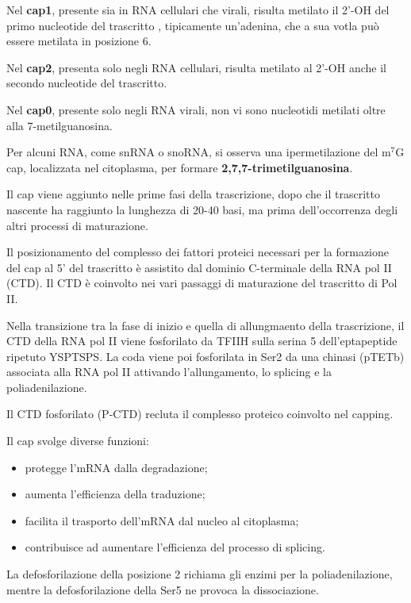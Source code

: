 \documentclass[11pt]{book}
\begin{document}
Nel \textbf{cap1}, presente sia in RNA cellulari che virali, risulta
metilato il 2'-OH del primo nucleotide del trascritto , tipicamente
un'adenina, che a sua votla può essere metilata in posizione 6.

Nel \textbf{cap2}, presenta solo negli RNA cellulari, risulta metilato
al 2'-OH anche il secondo nucleotide del trascritto.

Nel \textbf{cap0}, presente solo negli RNA virali, non vi sono
nucleotidi metilati oltre alla 7-metilguanosina.

Per alcuni RNA, come snRNA o snoRNA, si osserva una ipermetilazione del
m\(^7\)G cap, localizzata nel citoplasma, per formare
\textbf{2,7,7-trimetilguanosina}.

Il cap viene aggiunto nelle prime fasi della trascrizione, dopo che il
trascritto nascente ha raggiunto la lunghezza di 20-40 basi, ma prima
dell'occorrenza degli altri processi di maturazione.

Il posizionamento del complesso dei fattori proteici necessari per la
formazione del cap al 5' del trascritto è assistito dal dominio
C-terminale della RNA pol II (CTD). Il CTD è coinvolto nei vari passaggi
di maturazione del trascritto di Pol II.

Nella transizione tra la fase di inizio e quella di allungmaento della
trascrizione, il CTD della RNA pol II viene fosforilato da TFIIH sulla
serina 5 dell'eptapeptide ripetuto YSPTSPS. La coda viene poi
fosforilata in Ser2 da una chinasi (pTETb) associata alla RNA pol II
attivando l'allungamento, lo splicing e la poliadenilazione.

Il CTD fosforilato (P-CTD) recluta il complesso proteico coinvolto nel
capping.

Il cap svolge diverse funzioni:

\begin{itemize}
\itemsep1pt\parskip0pt
\item
  protegge l'mRNA dalla degradazione;
\item
  aumenta l'efficienza della traduzione;
\item
  facilita il trasporto dell'mRNA dal nucleo al citoplasma;
\item
  contribuisce ad aumentare l'efficienza del processo di splicing.
\end{itemize}

La defosforilazione della posizione 2 richiama gli enzimi per la
poliadenilazione, mentre la defosforilazione della Ser5 ne provoca la
dissociazione.
\end{document}
